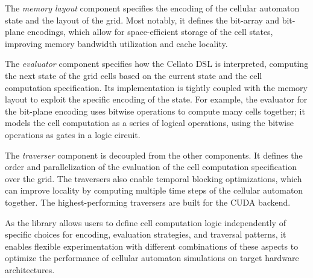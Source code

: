 The \emph{memory layout} component specifies the encoding of the cellular automaton state and the layout of the grid. Most notably, it defines the bit-array and bit-plane encodings, which allow for space-efficient storage of the cell states, improving memory bandwidth utilization and cache locality.

The \emph{evaluator} component specifies how the Cellato DSL is interpreted, computing the next state of the grid cells based on the current state and the cell computation specification. Its implementation is tightly coupled with the memory layout to exploit the specific encoding of the state. For example, the evaluator for the bit-plane encoding uses bitwise operations to compute many cells together; it models the cell computation as a series of logical operations, using the bitwise operations as gates in a logic circuit.

The \emph{traverser} component is decoupled from the other components. It defines the order and parallelization of the evaluation of the cell computation specification over the grid. The traversers also enable temporal blocking optimizations, which can improve locality by computing multiple time steps of the cellular automaton together. The highest-performing traversers are built for the CUDA backend.

As the library allows users to define cell computation logic independently of specific choices for encoding, evaluation strategies, and traversal patterns, it enables flexible experimentation with different combinations of these aspects to optimize the performance of cellular automaton simulations on target hardware architectures.
